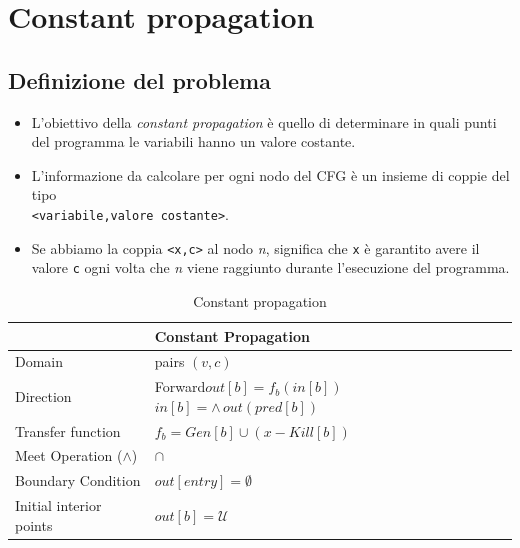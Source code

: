 \documentclass[10pt,a4paper]{article}
\begin{document}
\newpage
\section{Constant propagation}

\subsection{Definizione del problema}

\begin{itemize}
  \item L'obiettivo della \textit{constant propagation} \`e quello di determinare in quali punti del programma le variabili hanno un valore costante.
  \item L'informazione da calcolare per ogni nodo del CFG \`e un insieme di coppie del tipo\\\lstinline|<variabile,valore costante>|.
  \item Se abbiamo la coppia \lstinline|<x,c>| al nodo \textit{n}, significa che \lstinline|x| \`e garantito avere il valore \lstinline|c| ogni volta che \textit{n} viene raggiunto durante l'esecuzione del programma.
\end{itemize}


\begin{table}[h!]
  \centering
  \begin{tabular}{|l|p{4cm}|}
    \hline
    \textbf{} & \textbf{Constant Propagation} \\
    \hline
    Domain & pairs $(v,c)$\\
    \hline
    Direction & Forward\newline $out[b]=f_{b}(in[b])$ \newline $in[b] = \wedge\, out(pred[b])$ \\
    \hline
    Transfer function & $f_{b}=Gen[b] \cup (x - Kill[b])$ \\
    \hline
    Meet Operation (\(\land\)) & $\cap$\\
    \hline
    Boundary Condition & $out[entry]=\emptyset$ \\
    \hline
    Initial interior points & $out[b]=\mathcal{U}$ \\
    \hline
  \end{tabular}
  \caption{Constant propagation}
\end{table}
\end{document}
